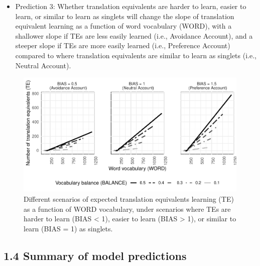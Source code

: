 \documentclass[
  english,
  ,man,floatsintext]{apa6}
\providecommand{\tightlist}{%
  \setlength{\itemsep}{0pt}\setlength{\parskip}{0pt}}
\begin{document}
\begin{itemize}
\tightlist
\item
  Prediction 3: Whether translation equivalents are harder to learn, easier to learn, or similar to learn as singlets will change the slope of translation equivalent learning as a function of word vocabulary (WORD), with a shallower slope if TEs are less easily learned (i.e., Avoidance Account), and a steeper slope if TEs are more easily learned (i.e., Preference Account) compared to where translation equivalents are similar to learn as singlets (i.e., Neutral Account).
\end{itemize}

\begin{figure}[H]

{\centering \includegraphics[width=1\linewidth,height=0.8\textheight]{paper_TE_bilingual_vocabulary_model_files/figure-latex/fig3-1} 

}

\caption{Different scenarios of expected translation equivalents learning (TE) as a function of WORD vocabulary, under scenarios where TEs are harder to learn (BIAS < 1), easier to learn (BIAS > 1), or similar to learn (BIAS = 1) as singlets.}\label{fig:fig3}
\end{figure}

\hypertarget{summary-of-model-predictions}{%
\subsection{1.4 Summary of model predictions}\label{summary-of-model-predictions}}
\end{document}
